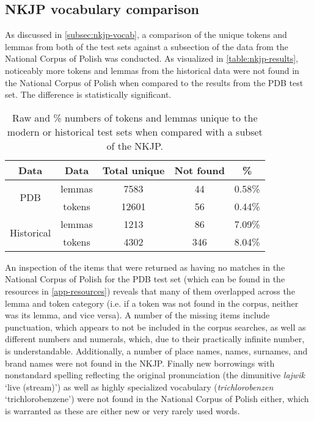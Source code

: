 \subsection{NKJP vocabulary comparison}
\label{subsec:nkjp-comparison-results}

As discussed in \autoref{subsec:nkjp-vocab}, a comparison of the unique tokens and lemmas from both of the test sets against a subsection of the data from the National Corpus of Polish was conducted. As visualized in \autoref{table:nkjp-results}, noticeably more tokens and lemmas from the historical data were not found in the National Corpus of Polish when compared to the results from the PDB test set. The difference is statistically significant. 

\renewcommand{\arraystretch}{1.25}
\begin{table}[H]
\begin{center}
\begin{tabular}{|cc|c|c|c|}
\hline \bf Data & \bf Data & \bf Total unique & \bf Not found & \bf \% \\ \hline
\multirow{2}{4em}{PDB}
& lemmas & 7583 & 44 & 0.58\%  \\
& tokens & 12601 & 56 & 0.44\%  \\
\multirow{2}{4em}{Historical}
& lemmas & 1213 & 86 & 7.09\%  \\
& tokens & 4302 & 346 & 8.04\% \\ 
\hline
\end{tabular}
\caption{\label{table:nkjp-results} Raw and \% numbers of tokens and lemmas unique to the modern or historical test sets when compared with a subset of the NKJP.}
\end{center}
\end{table}

An inspection of the items that were returned as having no matches in the National Corpus of Polish for the PDB test set (which can be found in the resources in \autoref{app-resources}) reveals that many of them overlapped across the lemma and token category (i.e. if a token was not found in the corpus, neither was its lemma, and vice versa). A number of the missing items include punctuation, which appears to not be included in the corpus searches, as well as different numbers and numerals, which, due to their practically infinite number, is understandable. Additionally, a number of place names, names, surnames, and brand names were not found in the NKJP. Finally new borrowings with nonstandard spelling reflecting the original pronunciation (the dimunitive \textit{lajwik} `live (stream)') as well as highly specialized vocabulary (\textit{trichlorobenzen} `trichlorobenzene') were not found in the National Corpus of Polish either, which is warranted as these are either new or very rarely used words.

